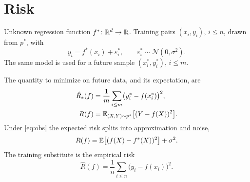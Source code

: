 \section{Risk}
\label{sec:risk}

Unknown regression function \(f^*\colon\mathbb{R}^d\to\mathbb{R}\).
Training pairs \((x_i,y_i)\), \(i\le n\), drawn from \(p^*\), with
\begin{equation}
y_i = f^*(x_i)+\varepsilon_i^*,\qquad \varepsilon_i^*\sim\mathcal{N}(0,\sigma^2).
\label{eq:obs}
\end{equation}
The same model is used for a future sample \((x_i^*,y_i^*)\), \(i\le m\).

The quantity to minimize on future data, and its expectation, are
\begin{align}
\hat R_*(f)
&= \frac1m\sum_{i\le m}\bigl(y_i^*-f(x_i^*)\bigr)^2,
\label{eq:future}\\
R(f)
&= \mathbb{E}_{(X,Y)\sim p^*}\bigl[(Y-f(X))^2\bigr].
\label{eq:risk}
\end{align}
Under \eqref{eq:obs} the expected risk splits into approximation and noise,
\begin{equation}
R(f)
= \mathbb{E}\bigl[(f(X)-f^*(X))^2\bigr] + \sigma^2.
\label{eq:risk-split}
\end{equation}
The training substitute is the empirical risk
\begin{equation}
\hat R(f) = \frac1n\sum_{i\le n}\bigl(y_i-f(x_i)\bigr)^2.
\label{eq:empirical}
\end{equation}
